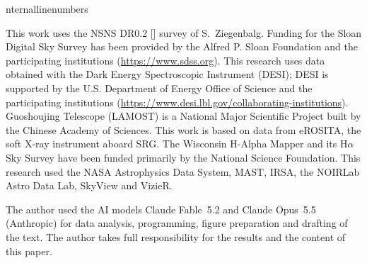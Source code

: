 \documentclass[twocolumn]{aastex631}
\begin{document}
\expandafter\let\csname internallinenumbers\endcsname\relax
\begin{acknowledgments}
This work uses the NSNS DR0.2 [] survey of S.~Ziegenbalg. Funding for the Sloan Digital Sky Survey has been provided by the Alfred P. Sloan Foundation and the participating institutions (\url{https://www.sdss.org}). This research uses data obtained with the Dark Energy Spectroscopic Instrument (DESI); DESI is supported by the U.S. Department of Energy Office of Science and the participating institutions (\url{https://www.desi.lbl.gov/collaborating-institutions}). Guoshoujing Telescope (LAMOST) is a National Major Scientific Project built by the Chinese Academy of Sciences. This work is based on data from eROSITA, the soft X-ray instrument aboard SRG. The Wisconsin H-Alpha Mapper and its H$\alpha$ Sky Survey have been funded primarily by the National Science Foundation. This research used the NASA Astrophysics Data System, MAST, IRSA, the NOIRLab Astro Data Lab, SkyView and VizieR.

The author used the AI models Claude Fable~5.2 and Claude Opus~5.5 (Anthropic) for data analysis, programming, figure preparation and drafting of the text. The author takes full responsibility for the results and the content of this paper.
\end{acknowledgments}



\appendix
\restartappendixnumbering


{}

\end{document}

